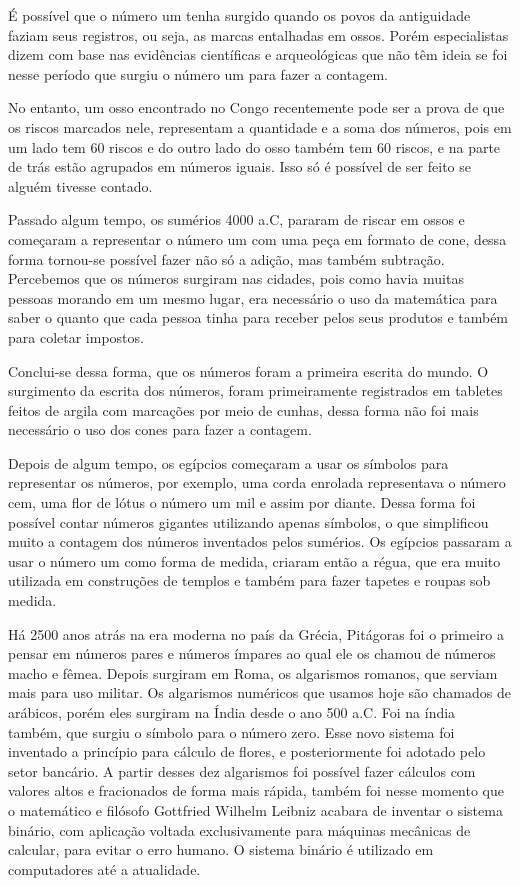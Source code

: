 \documentclass[
	12pt,				%
	openright,			%
	twoside,			%
	a4paper,			%
	english,			%
	french,				%
	spanish,			%
	brazil,				%
	]{abntex2}
\begin{document}
É possível que o número um tenha surgido quando os povos da antiguidade faziam seus registros, ou seja, as marcas entalhadas em ossos. Porém especialistas dizem com base nas evidências científicas e arqueológicas que não têm ideia se foi nesse período que surgiu o número um para fazer a contagem.
\par
No entanto, um osso encontrado no Congo recentemente pode ser a prova de que os riscos marcados nele, representam a quantidade e a  soma dos números, pois em um lado tem 60 riscos e do outro lado do osso também tem 60 riscos, e na parte de trás estão agrupados em números iguais. Isso só é possível de ser feito se alguém tivesse contado.
\par
Passado algum tempo, os sumérios 4000 a.C, pararam de riscar em ossos e começaram a representar o número um com uma peça em formato de cone, dessa forma tornou-se possível fazer não só a adição, mas também subtração. Percebemos que os números surgiram nas cidades, pois como havia muitas pessoas morando em um mesmo lugar, era necessário o uso da matemática para saber o quanto que cada  pessoa tinha  para receber pelos seus produtos e também para coletar impostos.
\par
Conclui-se dessa forma, que os números foram a primeira escrita do mundo. O surgimento da escrita dos números, foram primeiramente registrados em tabletes feitos de argila com marcações por meio de cunhas, dessa forma não foi mais necessário o uso dos cones para fazer a contagem.
\par
Depois de algum tempo, os egípcios começaram a usar os símbolos para representar os números, por exemplo, uma corda enrolada representava o número cem, uma flor de lótus o número um mil e assim por diante. Dessa forma foi possível contar números gigantes utilizando apenas símbolos, o que simplificou muito a contagem dos números inventados pelos sumérios. Os egípcios passaram a usar o número um como forma de medida, criaram então a régua, que era muito utilizada em construções de templos e também para fazer tapetes e roupas sob medida.
\par
Há 2500 anos atrás na era moderna no país da Grécia, Pitágoras foi o primeiro a pensar em números pares e números ímpares ao qual ele os chamou de números macho e fêmea. Depois surgiram em Roma, os algarismos romanos, que serviam mais para uso militar. Os algarismos numéricos que usamos hoje são chamados de arábicos, porém eles surgiram na Índia desde o ano 500 a.C. Foi na índia também, que surgiu o símbolo para o número zero. Esse novo sistema foi inventado a princípio para cálculo de flores, e posteriormente foi adotado pelo setor bancário. A partir desses dez algarismos foi possível fazer cálculos com valores altos e fracionados de forma mais rápida, também foi nesse momento que o matemático e filósofo Gottfried Wilhelm Leibniz acabara de inventar o sistema binário, com aplicação voltada exclusivamente para máquinas mecânicas de calcular, para evitar o erro humano. O sistema binário é utilizado em computadores até a atualidade.
\end{document}
